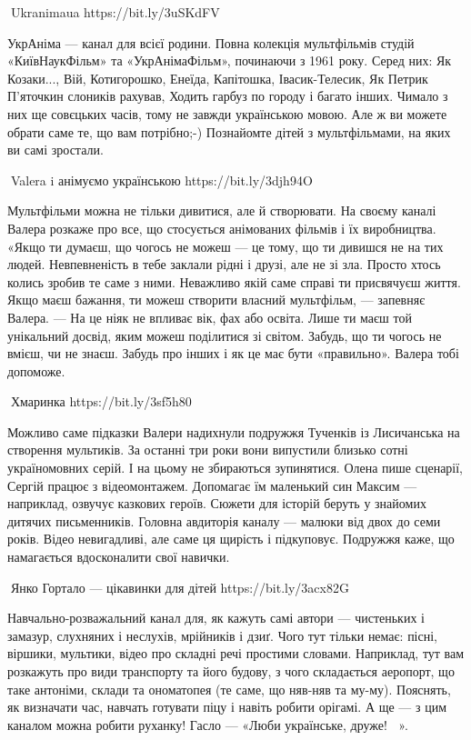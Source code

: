 🦉Ukranimaua https://bit.ly/3uSKdFV

УкрАніма — канал для всієї родини. Повна колекція мультфільмів студій
«КиївНаукФільм» та «УкрАнімаФільм», починаючи з 1961 року. Серед них: Як
Козаки..., Вій, Котигорошко, Енеїда, Капітошка, Івасик-Телесик, Як Петрик
П'яточкин слоників рахував, Ходить гарбуз по городу і багато інших. Чимало з
них ще совєцьких часів, тому не завжди українською мовою. Але ж ви можете
обрати саме те, що вам потрібно;-) Познайомте дітей з мультфільмами, на яких ви
самі зростали.

🦉Valera i анімуємо українською https://bit.ly/3djh94O

Мультфільми можна не тільки дивитися, але й створювати. На своєму каналі Валера
розкаже про все, що стосується анімованих фільмів і їх виробництва. «Якщо ти
думаєш, що чогось не можеш — це тому, що ти дивишся не на тих людей.
Невпевненість в тебе заклали рідні і друзі, але не зі зла. Просто хтось колись
зробив те саме з ними. Неважливо якій саме справі ти присвячуєш життя. Якщо
маєш бажання, ти можеш створити власний мультфільм, — запевняє Валера. — На це
ніяк не впливає вік, фах або освіта. Лише ти маєш той унікальний досвід, яким
можеш поділитися зі світом. Забудь, що ти чогось не вмієш, чи не знаєш. Забудь
про інших і як це має бути «правильно». Валера тобі допоможе. 

🦉Хмаринка https://bit.ly/3sf5h80 

Можливо саме підказки Валери надихнули подружжя Тученків із Лисичанська на
створення мультиків. За останні три роки вони випустили близько сотні
україномовних серій. І на цьому не збираються зупинятися. Олена пише сценарії,
Сергій працює з відеомонтажем. Допомагає їм маленький син Максим — наприклад,
озвучує казкових героїв. Сюжети для історій беруть у знайомих дитячих
письменників. Головна авдиторія каналу — малюки від двох до семи років. Відео
невигадливі, але саме ця щирість і підкуповує. Подружжя каже, що намагається
вдосконалити свої навички.

🦉Янко Гортало — цікавинки для дітей https://bit.ly/3acx82G 

Навчально-розважальний канал для, як кажуть самі автори — чистеньких і замазур,
слухняних і неслухів, мрійників і дзиґ. Чого тут тільки немає: пісні, віршики,
мультики, відео про складні речі простими словами. Наприклад, тут вам розкажуть
про види транспорту та його будову, з чого складається аеропорт, що таке
антоніми, склади та ономатопея (те саме, що няв-няв та му-му). Пояснять, як
визначати час, навчать готувати піцу і навіть робити орігамі. А ще — з цим
каналом можна робити руханку! Гасло — «Люби українське, друже! 💛💙».

